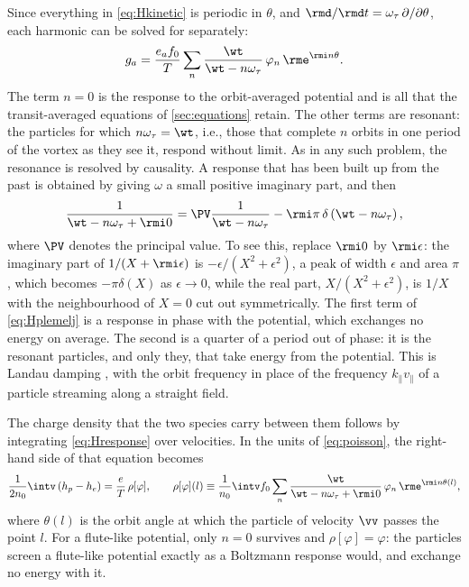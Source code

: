 Since everything in \cref{eq:Hkinetic} is periodic in \(\theta\), and \(\rmd/\rmd t = \omega_\tau\,\partial/\partial\theta\), each harmonic can be solved for separately:
\begin{equation}
g_a = \frac{e_af_0}{T}\sum_n\frac{\wt}{\wt - n\omega_\tau}\,\varphi_n\,\rme^{\rmi n\theta}.
\label{eq:Hresponse}
\end{equation}
The term \(n = 0\) is the response to the orbit-averaged potential and is all that the transit-averaged equations of \cref{sec:equations} retain. The other terms are resonant: the particles for which \(n\omega_\tau = \wt\), i.e., those that complete \(n\) orbits in one period of the vortex as they see it, respond without limit. As in any such problem, the resonance is resolved by causality. A response that has been built up from the past is obtained by giving \(\omega\) a small positive imaginary part, and then
\begin{equation}
\frac{1}{\wt - n\omega_\tau + \rmi0} = \PV\frac{1}{\wt - n\omega_\tau} - \rmi\pi\,\delta\left(\wt - n\omega_\tau\right),
\label{eq:Hplemelj}
\end{equation}
where \(\PV\) denotes the principal value. To see this, replace \(\rmi0\) by \(\rmi\epsilon\): the imaginary part of \(1/(X + \rmi\epsilon)\) is \(-\epsilon/(X^2 + \epsilon^2)\), a peak of width \(\epsilon\) and area \(\pi\), which becomes \(-\pi\delta(X)\) as \(\epsilon\to0\), while the real part, \(X/(X^2 + \epsilon^2)\), is \(1/X\) with the neighbourhood of \(X = 0\) cut out symmetrically. The first term of \cref{eq:Hplemelj} is a response in phase with the potential, which exchanges no energy on average. The second is a quarter of a period out of phase: it is the resonant particles, and only they, that take energy from the potential. This is Landau damping \citep{Landau1946}, with the orbit frequency in place of the frequency \(k_\parallel v_\parallel\) of a particle streaming along a straight field.

The charge density that the two species carry between them follows by integrating \cref{eq:Hresponse} over velocities. In the units of \cref{eq:poisson}, the right-hand side of that equation becomes
\begin{equation}
\frac{1}{2n_0}\intv\left(h_p - h_e\right) = \frac{e}{T}\,\rho[\varphi],
\qquad
\rho[\varphi](l) \equiv \frac{1}{n_0}\intv f_0\sum_n\frac{\wt}{\wt - n\omega_\tau + \rmi0}\,\varphi_n\,\rme^{\rmi n\theta(l)},
\label{eq:Hrho}
\end{equation}
where \(\theta(l)\) is the orbit angle at which the particle of velocity \(\vv\) passes the point \(l\). For a flute-like potential, only \(n = 0\) survives and \(\rho[\varphi] = \varphi\): the particles screen a flute-like potential exactly as a Boltzmann response would, and exchange no energy with it.

